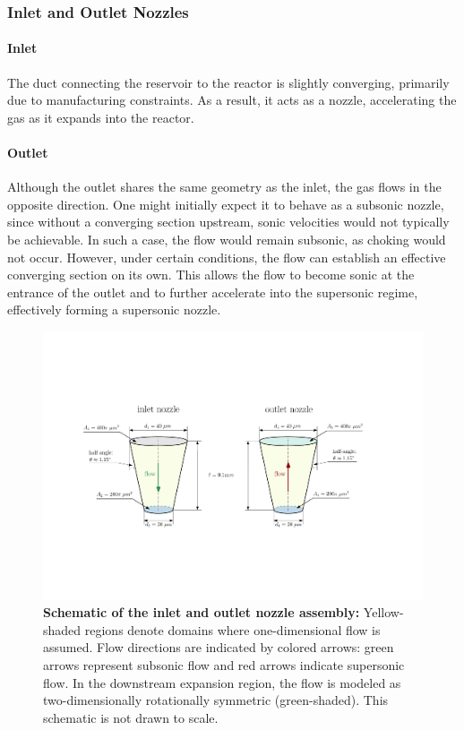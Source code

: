 \subsubsection*{Inlet and Outlet Nozzles}

	\paragraph{Inlet}
	The duct connecting the reservoir to the reactor is slightly converging, primarily due to manufacturing constraints.
	As a result, it acts as a nozzle, accelerating the gas as it expands into the reactor.

	\paragraph{Outlet}
		Although the outlet shares the same geometry as the inlet, the gas flows in the opposite direction.
		One might initially expect it to behave as a subsonic nozzle, since without a converging section upstream, sonic velocities would not typically be achievable.
		In such a case, the flow would remain subsonic, as choking would not occur.
		However, under certain conditions, the flow can establish an effective converging section on its own.
		This allows the flow to become sonic at the entrance of the outlet and to further accelerate into the supersonic regime, effectively forming a supersonic nozzle.
		\cite{jousten_handbook_2016}
		\begin{figure}[H]
		    \centering
		    \includegraphics[width=\textwidth]{src/03_analytical-work/fig_nozzle-geometries.pdf}
		    \caption[Schematic of the inlet and outlet nozzle assembly.]{
		        \textbf{Schematic of the inlet and outlet nozzle assembly:}
		        Yellow-shaded regions denote domains where one-dimensional flow is assumed.
		        Flow directions are indicated by colored arrows: green arrows represent subsonic flow and red arrows indicate supersonic flow.
		        In the downstream expansion region, the flow is modeled as two-dimensionally rotationally symmetric (green-shaded).
		        This schematic is not drawn to scale.
		    }
		    \label{fig:geometry-nozzles}
		\end{figure}

